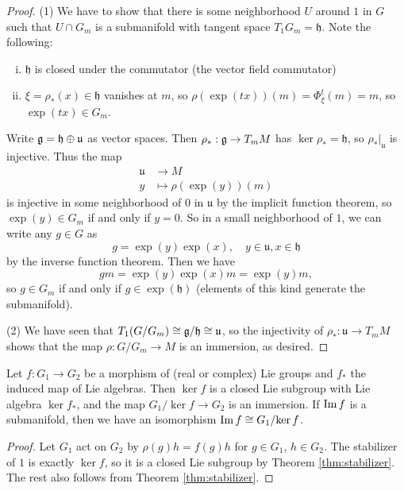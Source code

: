 \begin{proof}
  (1) We have to show that there
  is some neighborhood $U$ around $1$
  in $G$ such that
  $U \cap G_m$ is a submanifold
  with tangent space $T_1 G_m = \mathfrak{h}$.
  Note the following:
  \begin{enumerate}[(i)]
    \item $\mathfrak{h}$ is closed
      under the commutator
      (the vector field commutator)
    \item $\xi = \rho_*(x) \in \mathfrak{h}$
      vanishes at $m$, so
      $\rho(\exp(tx))(m) = \Phi_\xi^t(m) = m$, so
      $\exp(tx) \in G_m$.
  \end{enumerate}
  Write $\mathfrak{g} = \mathfrak{h} \oplus \mathfrak{u}$
  as vector spaces.
  Then $\rho_* : \mathfrak{g} \to T_m M$ has
  $\ker \rho_* = \mathfrak{h}$, so
  $\rho_*|_\mathfrak{u}$ is injective.
  Thus the map
  \begin{align*}
    \mathfrak{u} &\longrightarrow M \\
    y &\longmapsto \rho(\exp(y))(m)
  \end{align*}
  is injective in some neighborhood
  of $0$ in $\mathfrak{u}$ by
  the implicit function theorem, so
  $\exp(y) \in G_m$ if and only if
  $y = 0$. So in a small neighborhood
  of $1$, we can write any $g \in G$
  as
  \[
    g = \exp(y) \exp(x), \quad
    y \in \mathfrak{u}, x \in \mathfrak{h}
  \]
  by the inverse function theorem. Then
  we have
  \[
    gm = \exp(y) \exp(x) m
    = \exp(y) m,
  \]
  so $g \in G_m$ if and only if
  $g \in \exp(\mathfrak{h})$ (elements
  of this kind generate the submanifold).

  (2) We have seen that
  $T_1(G / G_m) \cong \mathfrak{g} / \mathfrak{h} \cong \mathfrak{u}$,
  so the injectivity of
  $\rho_* : \mathfrak{u} \to T_m M$
  shows that the map
  $\rho : G / G_m \to M$ is an immersion,
  as desired.
\end{proof}

\begin{corollary}
  Let $f : G_1 \to G_2$ be a morphism
  of (real or complex) Lie groups
  and $f_*$ the induced map
  of Lie algebras. Then
  $\ker f$ is a closed Lie subgroup
  with Lie algebra
  $\ker f_*$, and the map
  $G_1 / {\ker f} \to G_2$ is an
  immersion. If $\operatorname{Im} f$ is a
  submanifold, then we have an isomorphism
  $\operatorname{Im} f \cong G_1 / {\ker f}$.
\end{corollary}

\begin{proof}
  Let $G_1$ act on $G_2$ by
  $\rho(g) h = f(g) h$ for
  $g \in G_1$, $h \in G_2$.
  The stabilizer of $1$ is exactly
  $\ker f$, so it is a closed Lie
  subgroup by Theorem
  \ref{thm:stabilizer}. The rest
  also follows from
  Theorem \ref{thm:stabilizer}.
\end{proof}

